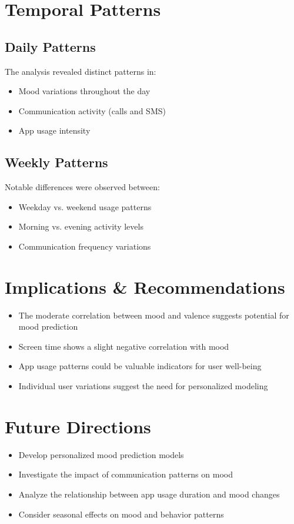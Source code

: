 \documentclass[11pt,a4paper]{article}
\begin{document}
\section{Temporal Patterns}
\subsection{Daily Patterns}
The analysis revealed distinct patterns in:
\begin{itemize}
    \item Mood variations throughout the day
    \item Communication activity (calls and SMS)
    \item App usage intensity
\end{itemize}

\subsection{Weekly Patterns}
Notable differences were observed between:
\begin{itemize}
    \item Weekday vs. weekend usage patterns
    \item Morning vs. evening activity levels
    \item Communication frequency variations
\end{itemize}

\section{Implications \& Recommendations}
\begin{itemize}
    \item The moderate correlation between mood and valence suggests potential for mood prediction
    \item Screen time shows a slight negative correlation with mood
    \item App usage patterns could be valuable indicators for user well-being
    \item Individual user variations suggest the need for personalized modeling
\end{itemize}

\section{Future Directions}
\begin{itemize}
    \item Develop personalized mood prediction models
    \item Investigate the impact of communication patterns on mood
    \item Analyze the relationship between app usage duration and mood changes
    \item Consider seasonal effects on mood and behavior patterns
\end{itemize}
\end{document}
